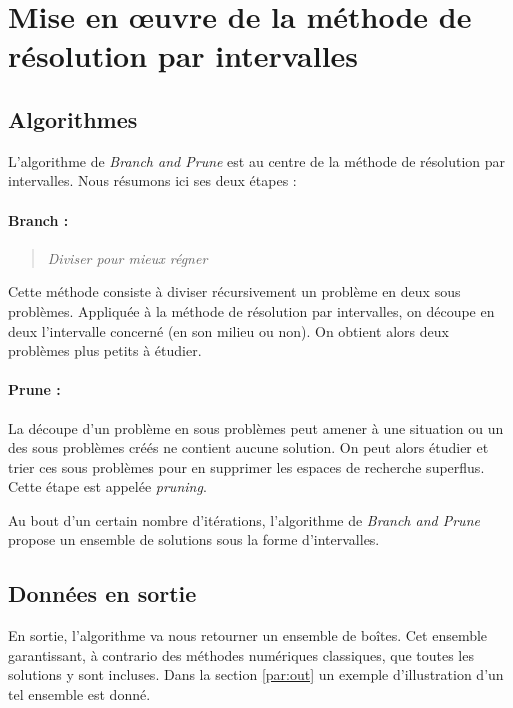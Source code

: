 \section{Mise en œuvre de la méthode de résolution par intervalles}



\subsection{Algorithmes}
L'algorithme de \emph{Branch and Prune} est au centre de la méthode de résolution par intervalles. Nous résumons ici ses deux étapes :  %
\paragraph{Branch :}
\begin{quote}\emph{Diviser pour mieux régner}\end{quote} Cette méthode consiste à diviser récursivement un problème en deux sous problèmes. Appliquée à la méthode de résolution par intervalles, on découpe en deux l'intervalle concerné (en son milieu ou non). On obtient alors deux problèmes plus \og petits \fg{} à étudier.%

\paragraph{Prune :}
La découpe d'un problème en sous problèmes peut amener à une situation ou un des sous problèmes créés ne contient aucune solution. On peut alors étudier et trier ces sous problèmes pour en supprimer les espaces de recherche superflus. Cette étape est appelée \emph{pruning}.

Au bout d'un certain nombre d'itérations, l'algorithme de \emph{Branch and Prune} propose un ensemble de solutions sous la forme d'intervalles.%





\subsection{Données en sortie}
En sortie, l'algorithme va nous retourner un ensemble de boîtes. Cet ensemble garantissant, à contrario des méthodes numériques classiques, que toutes les solutions y sont incluses. Dans la section \ref{par:out} un exemple d'illustration d'un tel ensemble est donné.


